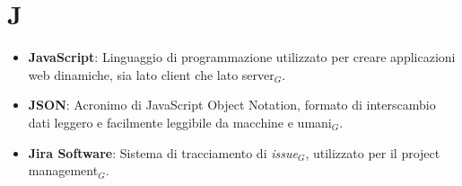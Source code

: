 \section{J}
\begin{itemize}
    \item \textbf{JavaScript}: Linguaggio di programmazione utilizzato per creare applicazioni web dinamiche, sia lato client che lato server$_G$.
    \item \textbf{JSON}: Acronimo di JavaScript Object Notation, formato di interscambio dati leggero e facilmente leggibile da macchine e umani$_G$.
    \item \textbf{Jira Software}: Sistema di tracciamento di \textit{issue}$_G$, utilizzato per il project management$_G$.
\end{itemize}
